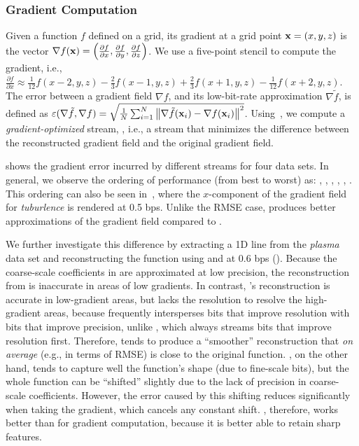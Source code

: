 \subsubsection{Gradient Computation} \label{sec:gradient}

Given a function $f$ defined on a grid, its gradient at a grid point \mbox{$\x = (x,y,z)$} is the
vector $\nabla f(\x) = \left(\frac{\partial f}{\partial x}, \frac{\partial f}{\partial y},
\frac{\partial f}{\partial z}\right)$. We use a five-point stencil to compute the gradient, i.e.,
$\frac{\partial f}{\partial x} \approx \frac{1}{12}f(x-2,y,z) - \frac{2}{3}f(x-1,y,z) +
\frac{2}{3}f(x+1,y,z) - \frac{1}{12}f(x+2,y,z)$. The error between a gradient field $\nabla f$, and
its low-bit-rate approximation $\nabla
\tilde{f}$, is defined as $\err(\nabla \tilde{f}, \nabla f) = \sqrt{\frac{1}{N}
\sum_{i=1}^{N}{\norm{\nabla \tilde{f}(\x_i)-\nabla f(\x_i)}^2}}$. Using~, we
compute a \emph{gradient-optimized} stream, \sgop, i.e., a stream that minimizes the difference
between the reconstructed gradient field and the original gradient field.

 shows the gradient error incurred by different streams for four
data sets. In general, we observe the ordering of performance (from best to worst) as: \sgop, \sgsg,
\sbit, \swav, \smag, \slvl. This ordering can also be seen in~,
where the $x$-component of the gradient field for \emph{tuburlence} is rendered at 0.5 bps. Unlike
the RMSE case, \sbit produces better approximations of the gradient field compared to \swav.

We further investigate this difference by extracting a 1D line from the \emph{plasma} data set and
reconstructing the function using \sbit and \swav at 0.6 bps
(). Because the coarse-scale coefficients in \sbit are
approximated at low precision, the reconstruction from \sbit is inaccurate in areas of low
gradients. In contrast, \swav's reconstruction is accurate in low-gradient areas, but lacks the
resolution to resolve the high-gradient areas, because \swav frequently intersperses bits that
improve resolution with bits that improve precision, unlike \sbit, which always streams bits that
improve resolution first. Therefore, \swav tends to produce a ``smoother'' reconstruction that
\emph{on average} (e.g., in terms of RMSE) is close to the original function. \sbit, on the other
hand, tends to capture well the function's shape (due to fine-scale bits), but the whole function
can be ``shifted'' slightly due to the lack of precision in coarse-scale coefficients. However, the
error caused by this shifting reduces significantly when taking the gradient, which cancels any
constant shift. \sbit, therefore, works better than \swav for gradient computation, because it is
better able to retain sharp features.

